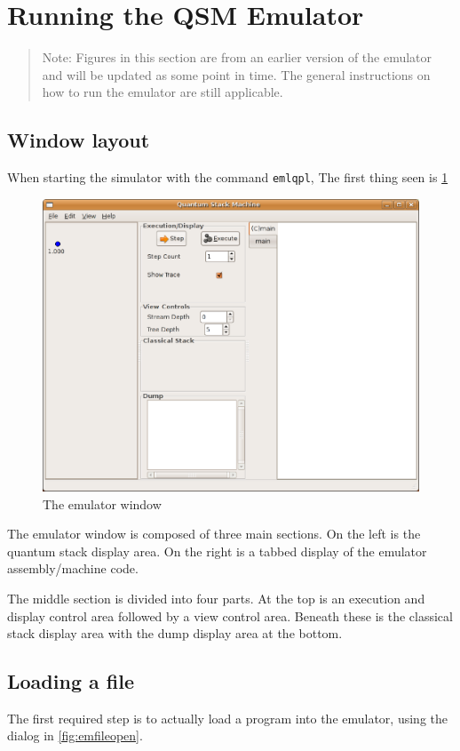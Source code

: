 \section{Running the QSM Emulator}\label{appsec:runningemulator}
\begin{quote}
Note: Figures in this section are from an earlier version of the
emulator
and will be updated as some point in time. The general instructions on
how to run the emulator are still applicable.
\end{quote}
\subsection{Window layout}
When starting the simulator with the command \texttt{emlqpl},
The first thing seen is \ref{fig:emulator}

\begin{figure}[htbp]
\centering
\includegraphics[scale=.5]{images/emulator/EmulatorAtStart.eps}
\caption{The emulator window}\label{fig:emulator}
\end{figure}

The emulator window is composed of three main sections. On the left is
the quantum stack display area. On the right is a tabbed display of the 
emulator assembly/machine code.
 
The middle section is divided into four parts. At the top is 
an execution and display control area followed by a view control area.
Beneath these is the  classical stack display area with
 the dump display area at the bottom.

\subsection{Loading a file}
The first required step is to actually load a program into the emulator,
using the  dialog in \ref{fig:emfileopen}.

